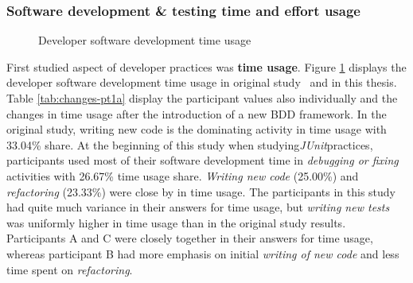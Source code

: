 \subsubsection{Software development \& testing time and effort usage}
    \begin{figure}[ht]%
        \centering
        \qquad
        \caption{Developer software development time usage}%
        \label{fig:time-usage}%
    \end{figure}
First studied aspect of developer practices was \textbf{time usage}. Figure \ref{fig:time-usage} displays the developer software development time usage
in original study~\cite{daka2014survey} and in this thesis. Table \ref{tab:changes-pt1a} display the participant values
also individually and the changes in time usage after the introduction of a new BDD framework. In the original study, writing
new code is the dominating activity in time usage with 33.04\% share. At the beginning of this study when studying\textit{JUnit}practices,
participants used most of their software development
time in \textit{debugging or fixing} activities with 26.67\% time usage share. \textit{Writing new code} (25.00\%) and \textit{refactoring} (23.33\%) were close
by in time usage. The participants in this study had quite much variance in their answers for time usage, but \textit{writing
new tests} was uniformly higher in time usage than in the original study results. Participants A and C
were closely together in their answers for time usage, whereas participant B had more emphasis on initial \textit{writing of new code} and
less time spent on \textit{refactoring}.

